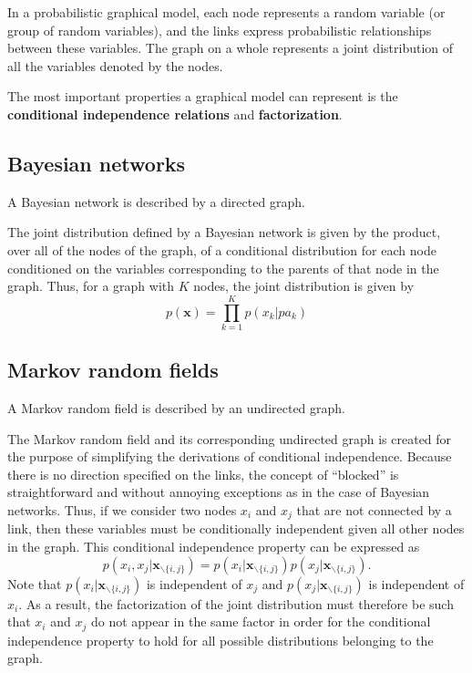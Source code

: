 \documentclass[a4paper]{book}
\renewcommand{\bf}{\mathbf}
\begin{document}
In a probabilistic graphical model, each node represents a random variable (or group of random variables), and the links express probabilistic relationships between these variables. The graph on a whole represents a joint distribution of all the variables denoted by the nodes.

The most important properties a graphical model can represent is the \textbf{conditional independence relations} and \textbf{factorization}.
\subsection{Bayesian networks}
A Bayesian network is described by a directed graph.

The joint distribution defined by a Bayesian network is given by the product, over all of the nodes of the graph, of a conditional distribution for each node conditioned on the variables corresponding to the parents of that node in the graph. Thus, for a graph with $K$ nodes, the joint distribution is given by
\begin{equation}
	p(\bf{x}) = \prod_{k=1}^K p(x_k|pa_k)
\end{equation}
\subsection{Markov random fields}
A Markov random field is described by an undirected graph.

The Markov random field and its corresponding undirected graph is created for the purpose of simplifying the derivations of conditional independence. Because there is no direction specified on the links, the concept of ``blocked'' is straightforward and without annoying exceptions as in the case of Bayesian networks. Thus, if we consider two nodes $x_i$ and $x_j$ that are not connected by a link, then these variables must be conditionally independent given all other nodes in the graph. This conditional independence property can be expressed as
\begin{equation}
	p(x_i,x_j|\bf{x}_{\backslash \{i,j\}}) = p(x_i|\bf{x}_{\backslash\{i,j\}}) p(x_j|\bf{x}_{\backslash
	\{i,j\}}).
\end{equation}
Note that $p(x_i|\bf{x}_{\backslash\{i,j\}})$ is independent of $x_j$ and $p(x_j|\bf{x}_{\backslash
	\{i,j\}})$ is independent of $x_i$. As a result, the factorization of the joint distribution must therefore be such that $x_i$ and $x_j$ do not appear in the same factor in order for the conditional independence property to hold for all possible distributions belonging to the graph.
\end{document}
